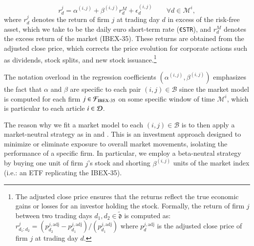 %
$$
r_{d}^{j} = \alpha^{(i,j)} + \beta^{(i,j)} r_{d}^M + \epsilon_{ d}^{(i,j)} 
\qquad  
\forall d \in \mathcal{M}^i
,
$$
where 
$r_{d}^{j}$ denotes the return of firm $j$ at trading day $d$ in excess of the risk-free asset, which we take to be the daily euro short-term rate (\texttt{\euro STR}),
and 
$r_{d}^M$ denotes the excess return of the market (IBEX-35).  
These returns are obtained from the adjusted close price, which corrects the price evolution for corporate actions such as dividends, stock splits, and new stock issuance.\footnote{
The adjusted close price ensures that the returns reflect the true economic gains or losses for an investor holding the stock. 
%
Formally, the return of firm $j$ between two trading days $d_1, d_2\in \tilde{\mathfrak{d}}$ is computed as:
$
r_{d_1:d_2}^{j} = 
(
p_{d_2}^{j,\text{adj}} - p_{d_1}^{j,\text{adj}}
)/(
p_{d_1}^{j,\text{adj}}
)
$
where $p_{d}^{j,\text{adj}}$ is the adjusted close price of firm $j$ at trading day $d$.
}

\mx 
The notation overload in the regression coefficients $(\alpha^{(i,j)},\beta^{(i,j)})$ emphasizes the fact that $\alpha$ and $\beta$ are specific to each pair $(i,j)\in\mathcal B$ since the market model is computed for each firm $j\in\mathcal{F}_{\text{IBEX-35}}$ on some specific window of time $\mathcal{M}^i$, which is particular to each article $i\in\mathcal{D}$.

\mx 
The reason why we fit a market model to each $(i,j)\in\mathcal B$ is to then apply a market-neutral strategy as in \cite{chan2003stock} and \cite{jiang2021pervasive}. This is an investment approach designed to minimize or eliminate exposure to overall market movements, isolating the performance of a specific firm. 
% 
In particular, we employ a beta-neutral strategy by buying one unit of firm $j$'s stock and shorting $\beta^{(i,j)}$ units of the market index (i.e.: an ETF replicating the IBEX-35). 


